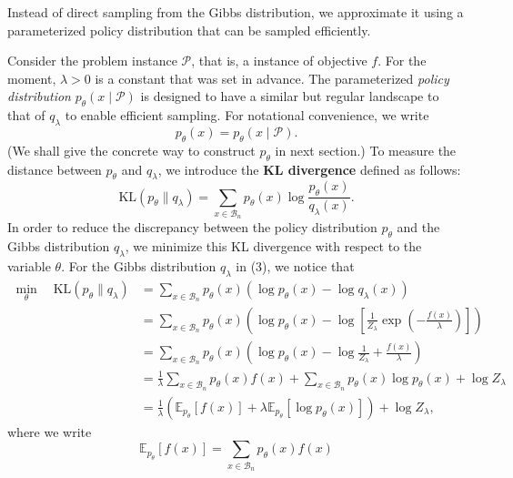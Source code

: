 Instead of direct sampling from the Gibbs distribution, we approximate it using a parameterized policy distribution that can be sampled efficiently. 

Consider the problem instance $\mathcal{P}$, that is, a instance of objective $f$. For the moment, $\lambda >0$ is a constant that was set in advance. The parameterized \textit{policy distribution} $p_{\theta}(x \mid \mathcal{P})$ is designed to have a similar but regular landscape to that of $q_{\lambda}$ to enable efficient sampling. For notational convenience, we write
\begin{equation}
    p_{\theta}(x)=p_{\theta}(x \mid \mathcal{P}).
\end{equation}
(We shall give the concrete way to construct $p_{\theta}$ in next section.) To measure the distance between $p_{\theta}$ and $q_{\lambda}$, we introduce the \textbf{KL divergence} defined as follows:
\begin{equation}
    \mathrm{KL}\left(p_{\theta} \| q_{\lambda}\right)=\sum_{x \in \mathcal{B}_{n}} p_{\theta}(x) \log \frac{p_{\theta}(x)}{q_{\lambda}(x)}.
\end{equation}
In order to reduce the discrepancy between the policy distribution $p_{\theta}$ and the Gibbs distribution $q_{\lambda}$, we minimize this KL divergence with respect to the variable $\theta$. For the Gibbs distribution $q_\lambda$ in (3), we notice that
\begin{align}
\min _{\theta} \quad \mathrm{KL}\left(p_{\theta} \| q_{\lambda}\right) 
& =\sum_{x \in \mathcal{B}_{n}} p_{\theta}(x) \left( \log p_{\theta}(x) - \log q_{\lambda}(x) \right) \\
& =\sum_{x \in \mathcal{B}_{n}} p_{\theta}(x) \left( \log  p_{\theta}(x) - \log \left[ \frac{1}{Z_\lambda} \exp \left(-\frac{f(x)}{\lambda}\right) \right]\right)  \\
& =\sum_{x \in \mathcal{B}_{n}} p_{\theta}(x) \left( \log  p_{\theta}(x) - \log \frac{1}{Z_\lambda} + \frac{f(x)}{\lambda}\right) \\
& =\frac{1}{\lambda} \sum_{x \in \mathcal{B}_{n}} p_{\theta}(x) f(x)+\sum_{x \in \mathcal{B}_{n}} p_{\theta}(x) \log p_{\theta}(x)+\log Z_{\lambda} \\
& =\frac{1}{\lambda}\left(\mathbb{E}_{p_{\theta}}[f(x)]+\lambda \mathbb{E}_{p_{\theta}}\left[\log p_{\theta}(x)\right]\right)+\log Z_{\lambda} ,\tag{5}
\end{align} 
where we write 
\begin{equation}
    \mathbb{E}_{p_\theta}[f(x)] = \sum_{x \in \mathcal{B}_n} p_\theta(x) f(x)
\end{equation}
